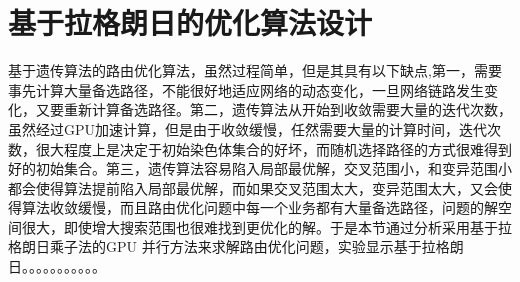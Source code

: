 \section{基于拉格朗日的优化算法设计}
  基于遗传算法的路由优化算法，虽然过程简单，但是其具有以下缺点,第一，需要事先计算大量备选路径，不能很好地适应网络的动态变化，一旦网络链路发生变化，又要重新计算备选路径。第二，遗传算法从开始到收敛需要大量的迭代次数，虽然经过GPU加速计算，但是由于收敛缓慢，任然需要大量的计算时间，迭代次数，很大程度上是决定于初始染色体集合的好坏，而随机选择路径的方式很难得到好的初始集合。第三，遗传算法容易陷入局部最优解，交叉范围小，和变异范围小都会使得算法提前陷入局部最优解，而如果交叉范围太大，变异范围太大，又会使得算法收敛缓慢，而且路由优化问题中每一个业务都有大量备选路径，问题的解空间很大，即使增大搜索范围也很难找到更优化的解。于是本节通过分析采用基于拉格朗日乘子法的GPU 并行方法来求解路由优化问题，实验显示基于拉格朗日。。。。。。。。。。。
